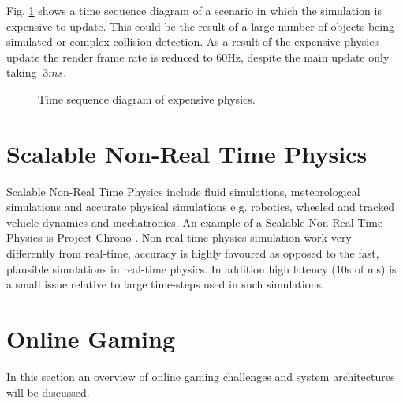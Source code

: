 Fig. \ref{ExpensivePhysics} shows a time sequence diagram of a scenario in which the simulation is expensive to update. This could be the result of a large number of objects being simulated or complex collision detection. As a result of the expensive physics update the render frame rate is reduced to 60Hz, despite the main update only taking $~3ms$.

\begin{figure}
	\centering
	
	\caption{Time sequence diagram of expensive physics.}
	\label{ExpensivePhysics}
\end{figure}

%
%	

\section{Scalable Non-Real Time Physics}
Scalable Non-Real Time Physics include fluid simulations, meteorological simulations and accurate physical simulations e.g. robotics, wheeled and tracked vehicle dynamics and mechatronics. An example of a Scalable Non-Real Time Physics is Project Chrono \cite{Chrono}. Non-real time physics simulation work very differently from real-time, accuracy is highly favoured as opposed to the fast, plausible simulations in real-time physics. In addition high latency (10s of ms) is a small issue relative to large time-steps used in such simulations.

\section{Online Gaming}
In this section an overview of online gaming challenges and system architectures will be discussed. 

